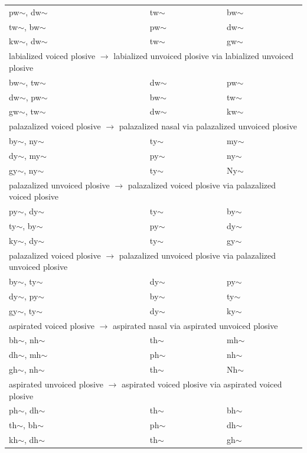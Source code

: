 \documentclass[11pt]{article}
\begin{document}
\begin{table}[h]
\begin{tabular}{ l | l | l }
pw$\sim$, dw$\sim$ & tw$\sim$ & bw$\sim$ \\
tw$\sim$, bw$\sim$ & pw$\sim$ & dw$\sim$ \\
kw$\sim$, dw$\sim$ & tw$\sim$ & gw$\sim$ \\
 \hline \multicolumn{3}{l}{labialized voiced plosive $\rightarrow$ labialized unvoiced plosive via labialized unvoiced plosive}\\  \hline
bw$\sim$, tw$\sim$ & dw$\sim$ & pw$\sim$ \\
dw$\sim$, pw$\sim$ & bw$\sim$ & tw$\sim$ \\
gw$\sim$, tw$\sim$ & dw$\sim$ & kw$\sim$ \\
 \hline \multicolumn{3}{l}{palazalized voiced plosive $\rightarrow$  palazalized nasal via palazalized unvoiced plosive}\\  \hline
by$\sim$, ny$\sim$ & ty$\sim$ & my$\sim$ \\
dy$\sim$, my$\sim$ & py$\sim$ & ny$\sim$ \\
gy$\sim$, ny$\sim$ & ty$\sim$ & Ny$\sim$ \\
 \hline \multicolumn{3}{l}{palazalized unvoiced plosive $\rightarrow$ palazalized voiced plosive via palazalized voiced plosive}\\  \hline
py$\sim$, dy$\sim$ & ty$\sim$ & by$\sim$ \\
ty$\sim$, by$\sim$ & py$\sim$ & dy$\sim$ \\
ky$\sim$, dy$\sim$ & ty$\sim$ & gy$\sim$ \\
 \hline \multicolumn{3}{l}{palazalized voiced plosive $\rightarrow$ palazalized unvoiced plosive via palazalized unvoiced plosive}\\  \hline
by$\sim$, ty$\sim$ & dy$\sim$ & py$\sim$ \\
dy$\sim$, py$\sim$ & by$\sim$ & ty$\sim$ \\
gy$\sim$, ty$\sim$ & dy$\sim$ & ky$\sim$ \\
 \hline \multicolumn{3}{l}{aspirated voiced plosive $\rightarrow$  aspirated nasal via aspirated unvoiced plosive}\\  \hline
bh$\sim$, nh$\sim$ & th$\sim$ & mh$\sim$ \\
dh$\sim$, mh$\sim$ & ph$\sim$ & nh$\sim$ \\
gh$\sim$, nh$\sim$ & th$\sim$ & Nh$\sim$ \\
 \hline \multicolumn{3}{l}{aspirated unvoiced plosive $\rightarrow$ aspirated voiced plosive via aspirated voiced plosive}\\  \hline
ph$\sim$, dh$\sim$ & th$\sim$ & bh$\sim$ \\
th$\sim$, bh$\sim$ & ph$\sim$ & dh$\sim$ \\
kh$\sim$, dh$\sim$ & th$\sim$ & gh$\sim$ \\


\end{tabular}
\end{table}
\end{document}
